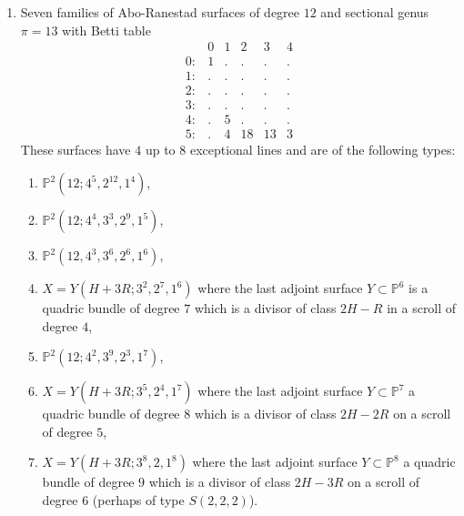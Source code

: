 \documentclass[twoside,12pt, leqno]{amsart}
\def\PP{{\mathbb P}}
\begin{document}
\begin{enumerate}
\item\label{ARsurf} Seven families of Abo-Ranestad surfaces of degree $12$ and sectional genus $\pi=13$ with Betti table
$$\begin{matrix}
       & 0 & 1 & 2 & 3 & 4\\
      0: & 1 & . & . & . & .\\
      1: & . & . & . & . & .\\
      2: & . & . & . & . & .\\
      3: & . & . & . & . & .\\
      4: & . & 5 & . & . & .\\
      5: & . & 4 & 18 & 13 & 3
      \end{matrix}$$
These surfaces have $4$ up to $8$ exceptional lines and are of the following types:
\begin{enumerate}
\item\label{ARsurfa}  $\PP^{2}(12;4^{5},2^{12},1^{4})$,
\item  $\PP^{2}(12;4^{4},3^{3},2^{9},1^{5})$,
\item $\PP^{2}(12,4^{3},3^{6},2^{6},1^{6})$,
 \item $X=Y(H+3R;3^{2},2^{7},1^{6})$ where the last adjoint surface $Y \subset \PP^{6}$ is a quadric bundle of degree $7$ which is a divisor of class $2H-R$ in a scroll of degree $4$, 
\item $\PP^{2}(12;4^{2},3^{9},2^{3},1^{7})$, 
\item  $X=Y(H+3R;3^{5},2^{4},1^{7})$ where the last adjoint surface $Y\subset \PP^{7}$ a quadric bundle of degree $8$ which is a divisor  of class $2H-2R$ on a scroll of degree $5$,
\item $X=Y(H+3R;3^{8},2,1^{8})$
where the last adjoint surface $Y \subset \PP^{8}$ a quadric bundle of degree $9$ which is  a divisor  of class $2H-3R$ on a scroll of degree $6$ (perhaps of type $S(2,2,2)$).
\end{enumerate}


\end{enumerate}
\end{document}
